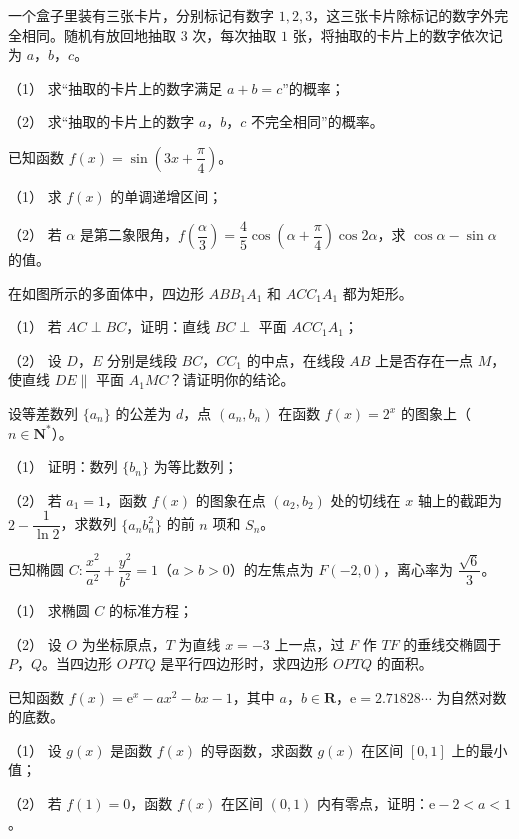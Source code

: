 \begin{question}
一个盒子里装有三张卡片，分别标记有数字 $1,2,3$，这三张卡片除标记的数字外完全相同。随机有放回地抽取 $3$ 次，每次抽取 $1$ 张，将抽取的卡片上的数字依次记为 $a$，$b$，$c$。

（1） 求“抽取的卡片上的数字满足 $a+b=c$”的概率；

（2） 求“抽取的卡片上的数字 $a$，$b$，$c$ 不完全相同”的概率。

\end{question}
\begin{question}
已知函数 $f(x)=\sin\left(3x+\dfrac\pi4\right)$。

（1） 求 $f(x)$ 的单调递增区间；

（2） 若 $\alpha$ 是第二象限角，$f\left(\dfrac\alpha3\right)=\dfrac45\cos\left(\alpha+\dfrac\pi4\right)\cos 2\alpha$，求 $\cos\alpha-\sin\alpha$ 的值。

\Needspace{0.4\textheight}
\end{question}
\begin{question}
在如图所示的多面体中，四边形 $ABB_1A_1$ 和 $ACC_1A_1$ 都为矩形。
\nopagebreak[4]
\begin{center}\end{center}
\nopagebreak[4]
（1） 若 $AC\perp BC$，证明：直线 $BC\perp$ 平面 $ACC_1A_1$；

（2） 设 $D$，$E$ 分别是线段 $BC$，$CC_1$ 的中点，在线段 $AB$ 上是否存在一点 $M$，使直线 $DE\parallel$ 平面 $A_1MC$？请证明你的结论。

\end{question}
\begin{question}
设等差数列 $\{a_n\}$ 的公差为 $d$，点 $(a_n,b_n)$ 在函数 $f(x)=2^x$ 的图象上（$n\in\mathbf N^*$）。

（1） 证明：数列 $\{b_n\}$ 为等比数列；

（2） 若 $a_1=1$，函数 $f(x)$ 的图象在点 $(a_2,b_2)$ 处的切线在 $x$ 轴上的截距为 $2-\dfrac1{\ln 2}$，求数列 $\{a_nb_n^2\}$ 的前 $n$ 项和 $S_n$。

\end{question}
\begin{question}
已知椭圆 $C:\dfrac{x^2}{a^2}+\dfrac{y^2}{b^2}=1$（$a>b>0$）的左焦点为 $F(-2,0)$，离心率为 $\dfrac{\sqrt6}3$。

（1） 求椭圆 $C$ 的标准方程；

（2） 设 $O$ 为坐标原点，$T$ 为直线 $x=-3$ 上一点，过 $F$ 作 $TF$ 的垂线交椭圆于 $P$，$Q$。当四边形 $OPTQ$ 是平行四边形时，求四边形 $OPTQ$ 的面积。

\end{question}
\begin{question}
已知函数 $f(x)=\mathrm e^x-ax^2-bx-1$，其中 $a$，$b\in\mathbf R$，$\mathrm e=2.71828\cdots$ 为自然对数的底数。

（1） 设 $g(x)$ 是函数 $f(x)$ 的导函数，求函数 $g(x)$ 在区间 $[0,1]$ 上的最小值；

（2） 若 $f(1)=0$，函数 $f(x)$ 在区间 $(0,1)$ 内有零点，证明：$\mathrm e-2<a<1$。

\end{question}